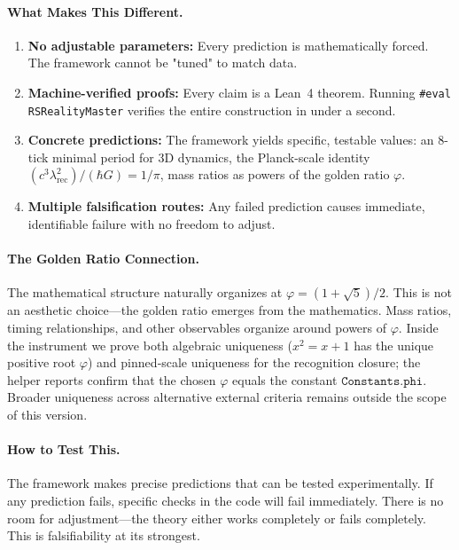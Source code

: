 \documentclass[11pt,a4paper,twoside]{article}
\numberwithin{equation}{section}
\theoremstyle{customthm}
\theoremstyle{customdef}
\theoremstyle{customrem}
\begin{document}
\paragraph{What Makes This Different.}
\begin{enumerate}[leftmargin=*,topsep=0pt,itemsep=2pt]
\item \textbf{No adjustable parameters:} Every prediction is mathematically forced. The framework cannot be "tuned" to match data.
\item \textbf{Machine-verified proofs:} Every claim is a Lean~4 theorem. Running \texttt{\#eval RSRealityMaster} verifies the entire construction in under a second.
\item \textbf{Concrete predictions:} The framework yields specific, testable values: an 8-tick minimal period for 3D dynamics, the Planck-scale identity $(c^3\lambda_{\mathrm{rec}}^2)/(\hbar G) = 1/\pi$, mass ratios as powers of the golden ratio $\varphi$.
\item \textbf{Multiple falsification routes:} Any failed prediction causes immediate, identifiable failure with no freedom to adjust.
\end{enumerate}

\paragraph{The Golden Ratio Connection.} The mathematical structure naturally organizes at $\varphi = (1+\sqrt{5})/2$. This is not an aesthetic choice—the golden ratio emerges from the mathematics. Mass ratios, timing relationships, and other observables organize around powers of $\varphi$. Inside the instrument we prove both algebraic uniqueness ($x^2=x+1$ has the unique positive root $\varphi$) and pinned‑scale uniqueness for the recognition closure; the helper reports confirm that the chosen $\varphi$ equals the constant $\texttt{Constants.phi}$. Broader uniqueness across alternative external criteria remains outside the scope of this version.

\paragraph{How to Test This.} The framework makes precise predictions that can be tested experimentally. If any prediction fails, specific checks in the code will fail immediately. There is no room for adjustment—the theory either works completely or fails completely. This is falsifiability at its strongest.
\end{document}
